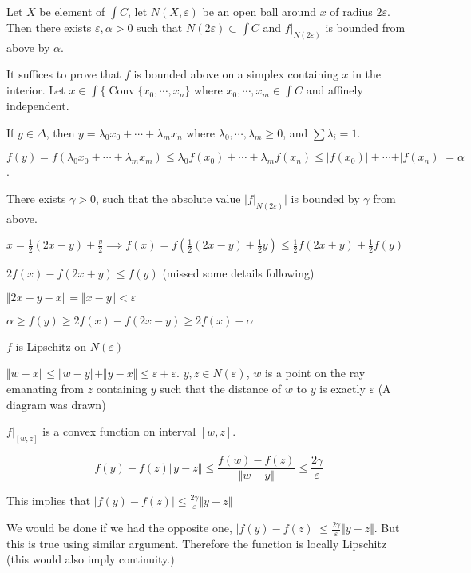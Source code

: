 \documentclass[11pt]{article}
\def\conv{\operatorname{Conv}}
\begin{document}
Let \(X\) be element of \(\int C\), let \(N(X, \varepsilon)\) be an open ball
around \(x\) of radius \(2\varepsilon\). Then there exists \(\varepsilon, \alpha >
    0\) such that \(N(2\varepsilon) \subset \int C\) and \(f\vert_{N(2\varepsilon)}\)
is bounded from above by \(\alpha\).

It suffices to prove that \(f\) is bounded above on a simplex containing \(x\)
in the interior. Let \(x \in \int\{\conv\{x_0, \cdots, x_{n}\}\) where \(x_0,
    \cdots, x_m \in \int C\) and affinely independent.

If \(y \in \Delta\), then \(y = \lambda_0 x_0 + \cdots + \lambda_m x_n\) where
\(\lambda_0, \cdots, \lambda_m \ge 0\), and \(\sum \lambda_i = 1\).

\(f(y) = f(\lambda_0 x_0 + \cdots + \lambda_m x_m) \le \lambda_0 f(x_0) +
    \cdots + \lambda_m f(x_n) \le \vert f(x_0) \vert + \cdots + \vert f(x_n)
    \vert = \alpha\).

There exists \(\gamma > 0\), such that the absolute value \(\vert
    f\vert_{N(2\varepsilon)}\vert\) is bounded by \(\gamma\) from above.

\(x = \frac{1}{2}(2x-y) + \frac{y}{2} \implies f(x) = f(\frac{1}{2}(2x-y) +
    \frac{1}{2}y) \le \frac{1}{2} f(2x + y) + \frac{1}{2} f(y)\)

\(2f(x) - f(2x + y) \le f(y)\) (missed some details following)

\(\Vert 2x - y - x\Vert = \Vert x - y \Vert < \varepsilon\)

\(\alpha \ge f(y) \ge 2 f(x) - f(2x - y) \ge 2 f(x) - \alpha\)

\(f\) is Lipschitz on \(N(\varepsilon)\)

\(\Vert w - x \Vert \le \Vert w - y\Vert + \Vert y - x\Vert \le \varepsilon +
    \varepsilon\). \(y, z \in N(\varepsilon)\), \(w\) is a point on the ray emanating
from \(z\) containing \(y\) such that the distance of \(w\) to \(y\) is exactly
\(\varepsilon\) (A diagram was drawn)

\(f\vert_{[w, z]}\) is a convex function on interval \([w, z]\).

$$\vert{f(y) - f(z)}{\Vert y -z\Vert} \le \frac{f(w) - f(z)}{\Vert w - y
    \Vert} \le \frac{2\gamma}{\varepsilon}$$

This implies that \(\vert f(y) - f(z)\vert \le \frac{2\gamma}{\varepsilon}
    \Vert y - z\Vert\)

We would be done if we had the opposite one, \(\vert f(y) - f(z)\vert \le
    \frac{2\gamma}{\varepsilon} \Vert y - z\Vert\). But this is true using
similar argument. Therefore the function is locally Lipschitz (this would
also imply continuity.)    
\end{document}
